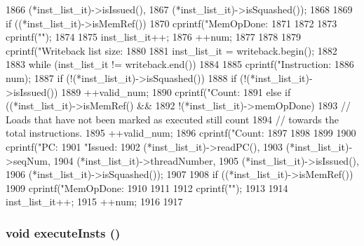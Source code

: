 \begin{DoxyCode}
{{1866                 (*inst_list_it)->isIssued(),
1867                 (*inst_list_it)->isSquashed());
1868 
1869         if ((*inst_list_it)->isMemRef()) {
1870             cprintf("MemOpDone:%
1871         }
1872 
1873         cprintf("\n");
1874 
1875         inst_list_it++;
1876         ++num;
1877     }
1878 
1879     cprintf("Writeback list size: %
1880 
1881     inst_list_it = writeback.begin();
1882 
1883     while (inst_list_it != writeback.end())
1884     {
1885         cprintf("Instruction:%
1886                 num);
1887         if (!(*inst_list_it)->isSquashed()) {
1888             if (!(*inst_list_it)->isIssued()) {
1889                 ++valid_num;
1890                 cprintf("Count:%
1891             } else if ((*inst_list_it)->isMemRef() &&
1892                        !(*inst_list_it)->memOpDone) {
1893                 // Loads that have not been marked as executed still count
1894                 // towards the total instructions.
1895                 ++valid_num;
1896                 cprintf("Count:%
1897             }
1898         }
1899 
1900         cprintf("PC:%
1901                 "Issued:%
1902                 (*inst_list_it)->readPC(),
1903                 (*inst_list_it)->seqNum,
1904                 (*inst_list_it)->threadNumber,
1905                 (*inst_list_it)->isIssued(),
1906                 (*inst_list_it)->isSquashed());
1907 
1908         if ((*inst_list_it)->isMemRef()) {
1909             cprintf("MemOpDone:%
1910         }
1911 
1912         cprintf("\n");
1913 
1914         inst_list_it++;
1915         ++num;
1916     }
1917 }
\end{DoxyCode}
\hypertarget{classBackEnd_a2d00e30d66a56e4667e28df302c98ac0}{
\subsubsection[{executeInsts}]{\setlength{\rightskip}{0pt plus 5cm}void executeInsts ()}}
\label{classBackEnd_a2d00e30d66a56e4667e28df302c98ac0}



